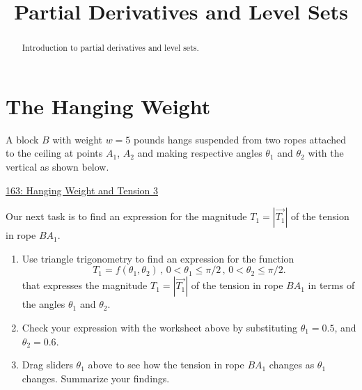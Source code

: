 \documentclass{ximera}
\title{Partial Derivatives and Level Sets}
\begin{document}
\begin{abstract}
Introduction to partial derivatives and level sets.
\end{abstract}
\maketitle



\section{The Hanging Weight}
\begin{question} \label{ExMD3fetet39}

A block $B$ with weight $w = 5$ pounds hangs suspended from two ropes attached to the ceiling at points $A_1$, $A_2$ and making respective angles $\theta_1$ and $\theta_2$ with the vertical as shown below. 


\begin{onlineOnly}
    \begin{center}
\end{center}
\end{onlineOnly}

\href{https://www.desmos.com/calculator/0fudotupws}{163: Hanging Weight and Tension 3}


\item Our next task is to find an expression for the magnitude $T_1 = |\overrightarrow{T_1}|$ of the tension in rope $BA_1$.

\begin{enumerate}
\item Use triangle trigonometry to find an expression for the function
\[
   T_1 = f(\theta_1, \theta_2) \, , \, 0 <  \theta_1 \leq \pi/2 \, , \,  0 <  \theta_2 \leq \pi/2.  
\]
that expresses the magnitude $T_1 = |\overrightarrow{T_1}|$ of the tension in rope $BA_1$ in terms of the angles $\theta_1$ and $\theta_2$. %


\item Check your expression with the worksheet above by substituting $\theta_1 = 0.5$, and $\theta_2=0.6$.

\item Drag sliders $\theta_1$ above to see how the tension in rope $BA_1$ changes as $\theta_1$ changes. Summarize your findings.


\end{enumerate}
\end{question}
\end{document}
